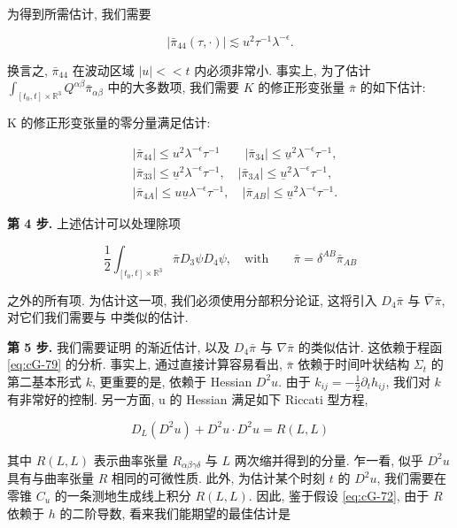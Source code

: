 为得到所需估计, 我们需要

\[
\left| \bar {\pi} _ {4 4} (\tau ,  \cdot) \right| \lesssim u ^ {2} \tau^ {- 1} \lambda^ {- \epsilon}.
\]

换言之, $\bar{\pi}_{44}$ 在波动区域 $|u|<<t$ 内必须非常小. 事实上, 为了估计 $\int_{[t_{0}, t]\times\mathbb{R}^{3}}Q^{\alpha\beta}\bar{\pi}_{\alpha\beta}$ 中的大多数项, 我们需要 $K$ 的修正形变张量 $\bar{\pi}$ 的如下估计:

\begin{proposition}\label{prop:cG-3.18}
K 的修正形变张量的零分量满足估计:

\begin{align*}
&| \bar {\pi} _ {4 4} | \leq u ^ {2} \lambda^ {- \epsilon} \tau^ {- 1} \qquad | \bar {\pi} _ {3 4} | \leq \underline {u} ^ {2} \lambda^ {- \epsilon} \tau^ {- 1}, \\
&| \bar {\pi} _ {3 3} | \leq \underline {u} ^ {2} \lambda^ {- \epsilon} \tau^ {- 1},  \quad | \bar {\pi} _ {3 A} | \leq \underline {u} ^ {2} \lambda^ {- \epsilon} \tau^ {- 1}, \\
&| \bar {\pi} _ {4 A} | \leq u \underline {u} \lambda^ {- \epsilon} \tau^ {- 1},  \quad | \bar {\pi} _ {A B} | \leq \underline {u} ^ {2} \lambda^ {- \epsilon} \tau^ {- 1}.
\end{align*}
\end{proposition}

\textbf{第 4 步.} 上述估计可以处理除项

\[
\frac {1}{2} \int_ {[ t _ {0},  t ] \times \mathbb {R} ^ {3}} \bar {\pi} D _ {3} \psi D _ {4} \psi ,  \quad \mathrm{with} \qquad \bar {\pi} = \delta^ {A B} \bar {\pi} _ {A B}
\]

之外的所有项. 为估计这一项, 我们必须使用分部积分论证, 这将引入 $D_4\bar{\pi}$ 与 $\overline{\nabla}\bar{\pi}$, 对它们我们需要与 中类似的估计. 

\textbf{第 5 步.} 我们需要证明 的渐近估计, 以及 $D_4\bar{\pi}$ 与 $\nabla \bar{\pi}$ 的类似估计. 这依赖于程函\eqref{eq:cG-79} 的分析. 事实上, 通过直接计算容易看出, $\bar{\pi}$ 依赖于时间叶状结构 $\Sigma_t$ 的第二基本形式 $k$, 更重要的是, 依赖于 Hessian $D^2 u$. 由于 $k_{ij} = -\frac{1}{2}\partial_t h_{ij}$, 我们对 $k$ 有非常好的控制. 另一方面, u 的 Hessian 满足如下 Riccati 型方程, 

\[
D _ {L} (D ^ {2} u) + D ^ {2} u \cdot D ^ {2} u = R (L,  L)
\]

其中 $R(L, L)$ 表示曲率张量 $R_{\alpha\beta\gamma\delta}$ 与 $L$ 两次缩并得到的分量. 乍一看, 似乎 $D^{2}u$ 具有与曲率张量 $R$ 相同的可微性质. 此外, 为估计某个时刻 $t$ 的 $D^{2}u$, 我们需要在零锥 $C_{u}$ 的一条测地生成线上积分 $R(L, L)$. 因此, 鉴于假设 \eqref{eq:cG-72}, 由于 $R$ 依赖于 $h$ 的二阶导数, 看来我们能期望的最佳估计是

